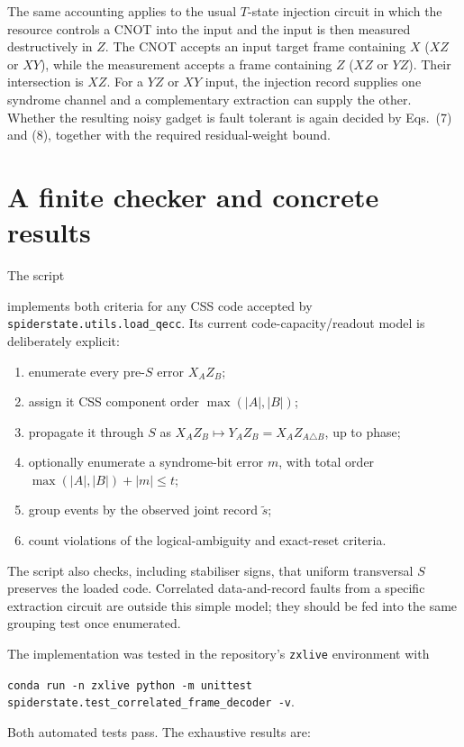 \documentclass[11pt]{article}
\theoremstyle{remark}
\begin{document}
The same accounting applies to the usual $T$-state injection circuit in
which the resource controls a CNOT into the input and the input is then
measured destructively in $Z$.  The CNOT accepts an input target frame
containing $X$ ($XZ$ or $XY$), while the measurement accepts a frame
containing $Z$ ($XZ$ or $YZ$).  Their intersection is $XZ$.  For a $YZ$ or
$XY$ input, the injection record supplies one syndrome channel and a
complementary extraction can supply the other.  Whether the resulting noisy
gadget is fault tolerant is again decided by Eqs.~(7) and (8), together with
the required residual-weight bound.

\section{A finite checker and concrete results}

The script
\begin{center}
\end{center}
implements both criteria for any CSS code accepted by
\texttt{spiderstate.utils.load\_qecc}.  Its current code-capacity/readout
model is deliberately explicit:
\begin{enumerate}[leftmargin=*,itemsep=2pt]
  \item enumerate every pre-$S$ error $X_AZ_B$;
  \item assign it CSS component order $\max(|A|,|B|)$;
  \item propagate it through $S$ as
        $X_AZ_B\mapsto Y_AZ_B=X_AZ_{A\triangle B}$, up to phase;
  \item optionally enumerate a syndrome-bit error $m$, with total order
        $\max(|A|,|B|)+|m|\leq t$;
  \item group events by the observed joint record $\widetilde s$;
  \item count violations of the logical-ambiguity and exact-reset criteria.
\end{enumerate}
The script also checks, including stabiliser signs, that uniform transversal
$S$ preserves the loaded code.  Correlated data-and-record faults from a
specific extraction circuit are outside this simple model; they should be
fed into the same grouping test once enumerated.

The implementation was tested in the repository's \texttt{zxlive}
environment with
\begin{center}
\small\texttt{conda run -n zxlive python -m unittest
spiderstate.test\_correlated\_frame\_decoder -v}.
\end{center}
Both automated tests pass.  The exhaustive results are:
\end{document}
